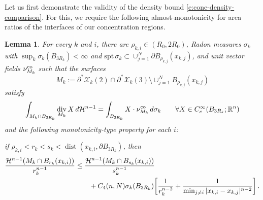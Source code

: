 \documentclass[10pt,reqno]{amsart}
\numberwithin{equation}{section}
\newtheorem{lemma}[theorem]{Lemma}
\theoremstyle{definition}
\DeclareMathOperator{\dist}{dist}
\newcommand{\spt}{\mathrm{spt}}
\DeclareMathOperator{\Div}{div}
\newcommand{\X}{\mathcal{X}}
\begin{document}
{Let us first demonstrate the validity of the density bound \eqref{e:cone-density-comparison}. For this, we require the following almost-monotonicity for area ratios of the interfaces of our concentration regions.

\begin{lemma}\label{l:monotonicity-concentrations}
    For every $k$ and $i$, there are $\rho_{k,i}\in (R_0,2R_0)$, Radon measures $\sigma_{k}$ with $\sup_k \sigma_k(B_{3R_k})<\infty$ and $\spt\, \sigma_{k}\subset \cup_{j=1}^N\partial B_{\rho_{k,j}}(x_{k,j})$, and unit vector fields $\nu_{M_k}^{\rm co}$ such that the surfaces
$$
M_k := \partial^*\X_k(2) \cap \partial^* \X_k(3) \setminus \cup_{j=1}^N B_{\rho_{k,j}}(x_{k,j})
$$
satisfy
\begin{align*}
   \int_{M_k \cap B_{3R_k}}\Div_{M_k}X \,d\mathcal{H}^{n-1} = \int_{B_{3R_k}} X \cdot \nu_{M_k}^{\rm co}\,d\sigma_k \qquad \forall X \in C_c^\infty(B_{3R_k};\mathbb{R}^n) 
\end{align*}
and the following monotonicity-type property for each $i$:
\smallskip

{\it if $\rho_{k,i}<r_k<s_k<\dist(x_{k,i},\partial B_{3R_k})$, then}
\begin{align}\label{eq:large scale area bounds}
    \frac{\mathcal{H}^{n-1}(M_k \cap B_{r_k}(x_{k,i}))}{r_k^{n-1}} &\leq \frac{\mathcal{H}^{n-1}(M_k \cap B_{s_k}(x_{k,i}))}{s_k^{n-1}} \\ \notag
    &\qquad + C_4(n,N)\sigma_k(B_{3R_k})\bigg[\frac{1}{r_k^{n-2}} + \frac{1}{\min_{j\neq i}|x_{k,i}-x_{k,j}|^{n-2}}\bigg]\,.
\end{align}
\end{lemma}

}
\end{document}
